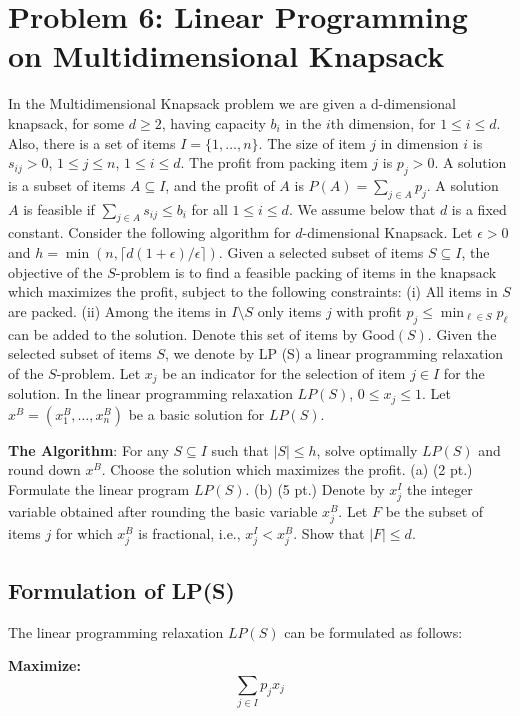 \section*{Problem 6: Linear Programming on Multidimensional Knapsack}
In the Multidimensional Knapsack problem we are given a d-dimensional
knapsack, for some $d \geq 2$, having capacity $b_i$ in the $i$th
dimension, for $1 \leq i \leq d$. Also, there is a set of items $I =
\{1, \ldots, n\}$. The size of item $j$ in dimension $i$ is $s_{ij} >
0$, $1 \leq j \leq n$, $1 \leq i \leq d$. The profit from packing
item $j$ is $p_j > 0$. A solution is a subset of items $A \subseteq
I$, and the profit of $A$ is $P(A) = \sum_{j \in A} p_j$.
A solution $A$ is feasible if $\sum_{j \in A} s_{ij} \leq b_i$ for
all $1 \leq i \leq d$.
We assume below that $d$ is a fixed constant. Consider the following
algorithm for $d$-dimensional Knapsack. Let $\epsilon > 0$ and $h =
\min(n, \lceil d(1+\epsilon)/\epsilon \rceil)$. Given a selected
subset of items $S \subseteq I$, the objective of the $S$-problem is
to find a feasible packing of items in the knapsack which maximizes
the profit, subject to the following constraints:
(i) All items in $S$ are packed.
(ii) Among the items in $I \setminus S$ only items $j$ with profit
$p_j \leq \min_{\ell \in S} p_\ell$ can be added to the solution.
Denote this set of items by $\text{Good}(S)$.
Given the selected subset of items $S$, we denote by LP (S) a linear
programming relaxation of the $S$-problem. Let $x_j$ be an indicator
for the selection of item $j \in I$ for the solution. In the linear
programming relaxation $LP(S)$, $0 \leq x_j \leq 1$. Let $x^B =
(x^B_1, \ldots, x^B_n)$ be a basic solution for $LP(S)$.

\textbf{The Algorithm}: For any $S \subseteq I$ such that $|S| \leq
h$, solve optimally $LP(S)$ and round down $x^B$. Choose the solution
which maximizes the profit.
(a) (2 pt.) Formulate the linear program $LP(S)$.
(b) (5 pt.) Denote by $x^I_j$ the integer variable obtained after
rounding the basic variable $x^B_j$. Let $F$ be the subset of items
$j$ for which $x^B_j$ is fractional, i.e., $x^I_j < x^B_j$. Show that
$|F| \leq d$.

\subsection*{Formulation of LP(S)}
The linear programming relaxation $LP(S)$ can be formulated as follows:

\textbf{Maximize:}
\[ \sum_{j \in I} p_j x_j \]

